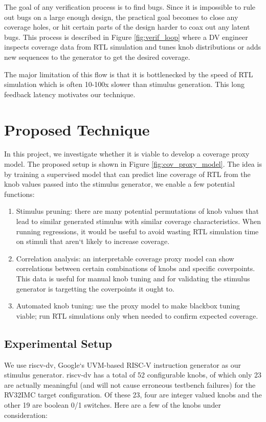 \documentclass[sigconf,noacm]{acmart}
\begin{document}
The goal of any verification process is to find bugs.
Since it is impossible to rule out bugs on a large enough design, the practical goal becomes to close any coverage holes, or hit certain parts of the design harder to coax out any latent bugs.
This process is described in Figure \ref{fig:verif_loop} where a DV engineer inspects coverage data from RTL simulation and tunes knob distributions or adds new sequences to the generator to get the desired coverage.

The major limitation of this flow is that it is bottlenecked by the speed of RTL simulation which is often 10-100x slower than stimulus generation.
This long feedback latency motivates our technique.

\section{Proposed Technique}

In this project, we investigate whether it is viable to develop a coverage proxy model.
The proposed setup is shown in Figure \ref{fig:cov_proxy_model}.
The idea is by training a supervised model that can predict line coverage of RTL from the knob values passed into the stimulus generator, we enable a few potential functions:

\begin{enumerate}
  \item Stimulus pruning: there are many potential permutations of knob values that lead to similar generated stimulus with similar coverage characteristics. When running regressions, it would be useful to avoid wasting RTL simulation time on stimuli that aren`t likely to increase coverage.
  \item Correlation analysis: an interpretable coverage proxy model can show correlations between certain combinations of knobs and specific coverpoints. This data is useful for manual knob tuning and for validating the stimulus generator is targetting the coverpoints it ought to.
  \item Automated knob tuning: use the proxy model to make blackbox tuning viable; run RTL simulations only when needed to confirm expected coverage.
\end{enumerate}

\subsection{Experimental Setup}

We use riscv-dv, Google`s UVM-based RISC-V instruction generator as our stimulus generator.
riscv-dv has a total of 52 configurable knobs, of which only 23 are actually meaningful (and will not cause erroneous testbench failures) for the RV32IMC target configuration.
Of these 23, four are integer valued knobs and the other 19 are boolean 0/1 switches.
Here are a few of the knobs under consideration:
\end{document}
